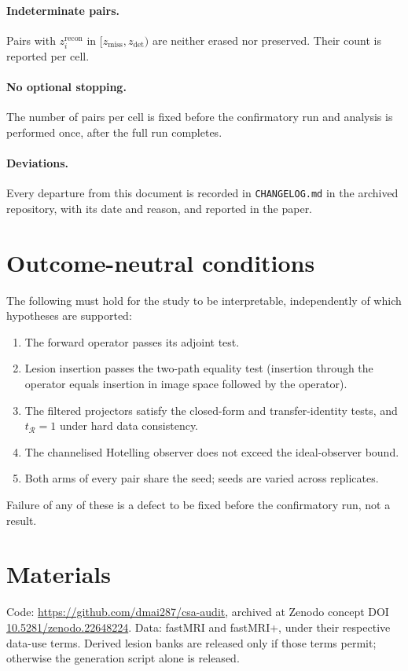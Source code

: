 \documentclass[11pt,a4paper]{article}
\begin{document}
\paragraph{Indeterminate pairs.} Pairs with $z_i^{\mathrm{recon}}$ in
$[z_{\mathrm{miss}}, z_{\mathrm{det}})$ are neither erased nor preserved.
Their count is reported per cell.

\paragraph{No optional stopping.} The number of pairs per cell is fixed before
the confirmatory run and analysis is performed once, after the full run
completes.

\paragraph{Deviations.} Every departure from this document is recorded in
\texttt{CHANGELOG.md} in the archived repository, with its date and reason,
and reported in the paper.

\section{Outcome-neutral conditions}

The following must hold for the study to be interpretable, independently of
which hypotheses are supported:

\begin{enumerate}[leftmargin=2em]
\item The forward operator passes its adjoint test.
\item Lesion insertion passes the two-path equality test (insertion through
the operator equals insertion in image space followed by the operator).
\item The filtered projectors satisfy the closed-form and transfer-identity
tests, and $t_{\mathcal{R}} = 1$ under hard data consistency.
\item The channelised Hotelling observer does not exceed the ideal-observer
bound.
\item Both arms of every pair share the seed; seeds are varied across
replicates.
\end{enumerate}

Failure of any of these is a defect to be fixed before the confirmatory run,
not a result.

\section*{Materials}

Code: \url{https://github.com/dmai287/csa-audit}, archived at Zenodo concept
DOI \href{https://doi.org/10.5281/zenodo.22648224}{10.5281/zenodo.22648224}.
Data: fastMRI and fastMRI+, under their respective data-use terms. Derived
lesion banks are released only if those terms permit; otherwise the generation
script alone is released.
\end{document}
